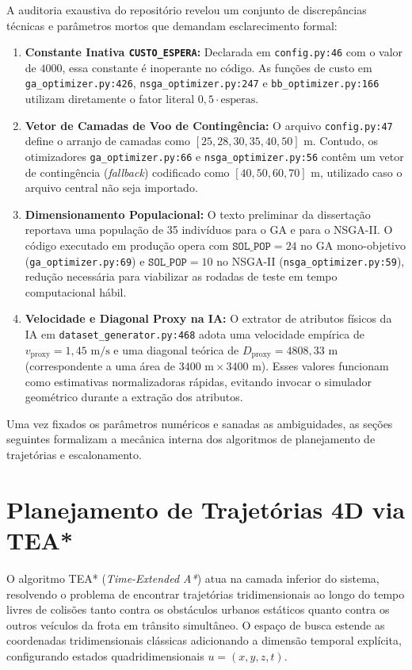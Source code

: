 A auditoria exaustiva do repositório revelou um conjunto de discrepâncias técnicas e parâmetros mortos que demandam esclarecimento formal:
\begin{enumerate}
    \item \textbf{Constante Inativa \texttt{CUSTO\_ESPERA}:} Declarada em \texttt{config.py:46} com o valor de $4000$, essa constante é inoperante no código. As funções de custo em \texttt{ga\_optimizer.py:426}, \texttt{nsga\_optimizer.py:247} e \texttt{bb\_optimizer.py:166} utilizam diretamente o fator literal $0{,}5 \cdot \text{esperas}$.
    \item \textbf{Vetor de Camadas de Voo de Contingência:} O arquivo \texttt{config.py:47} define o arranjo de camadas como $[25, 28, 30, 35, 40, 50]\text{ m}$. Contudo, os otimizadores \texttt{ga\_optimizer.py:66} e \texttt{nsga\_optimizer.py:56} contêm um vetor de contingência (\textit{fallback}) codificado como $[40, 50, 60, 70]\text{ m}$, utilizado caso o arquivo central não seja importado.
    \item \textbf{Dimensionamento Populacional:} O texto preliminar da dissertação reportava uma população de 35 indivíduos para o GA e para o NSGA-II. O código executado em produção opera com $\texttt{SOL\_POP} = 24$ no GA mono-objetivo (\texttt{ga\_optimizer.py:69}) e $\texttt{SOL\_POP} = 10$ no NSGA-II (\texttt{nsga\_optimizer.py:59}), redução necessária para viabilizar as rodadas de teste em tempo computacional hábil.
    \item \textbf{Velocidade e Diagonal Proxy na IA:} O extrator de atributos físicos da IA em \texttt{dataset\_generator.py:468} adota uma velocidade empírica de $v_{\text{proxy}} = 1{,}45\text{ m/s}$ e uma diagonal teórica de $D_{\text{proxy}} = 4808{,}33\text{ m}$ (correspondente a uma área de $3400\text{ m} \times 3400\text{ m}$). Esses valores funcionam como estimativas normalizadoras rápidas, evitando invocar o simulador geométrico durante a extração dos atributos.
\end{enumerate}

Uma vez fixados os parâmetros numéricos e sanadas as ambiguidades, as seções seguintes formalizam a mecânica interna dos algoritmos de planejamento de trajetórias e escalonamento.

\section{Planejamento de Trajetórias 4D via TEA*}\label{sec:dev_tea}

O algoritmo TEA* (\textit{Time-Extended A*}) atua na camada inferior do sistema, resolvendo o problema de encontrar trajetórias tridimensionais ao longo do tempo livres de colisões tanto contra os obstáculos urbanos estáticos quanto contra os outros veículos da frota em trânsito simultâneo. O espaço de busca estende as coordenadas tridimensionais clássicas adicionando a dimensão temporal explícita, configurando estados quadridimensionais $u = (x, y, z, t)$.


